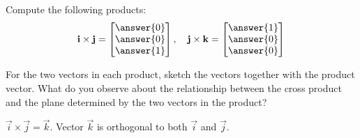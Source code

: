 \documentclass{ximera}
\begin{document}
\begin{exploration}\label{init:ijkcrossproducts}
Compute the following products:
$$\vec{i}\times\vec{j}=\begin{bmatrix}\answer{0}\\\answer{0}\\\answer{1}\end{bmatrix},\quad\vec{j}\times\vec{k}=\begin{bmatrix}\answer{1}\\\answer{0}\\\answer{0}\end{bmatrix}$$

For the two vectors in each product, sketch the vectors together with the product vector.  What do you observe about the relationship between the cross product and the plane determined by the two vectors in the product?  
\begin{hint}
$\vec{i}\times\vec{j}=\vec{k}$.  Vector $\vec{k}$ is orthogonal to both $\vec{i}$ and $\vec{j}$.  
\end{hint}



\end{exploration}
\end{document}
